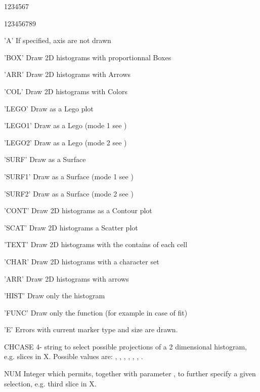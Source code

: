 \begin{DLtt}{1234567}
\begin{DLtt}{123456789}
\item['A']     If specified, axis are not drawn
\item['BOX']   Draw 2D histograms with proportionnal Boxes
\item['ARR']   Draw 2D histograms with Arrows
\item['COL']   Draw 2D histograms with Colors
\item['LEGO']  Draw as a Lego plot
\item['LEGO1'] Draw as a Lego (mode 1 see )
\item['LEGO2'] Draw as a Lego (mode 2 see )
\item['SURF']  Draw as a Surface
\item['SURF1'] Draw as a Surface (mode 1 see )
\item['SURF2'] Draw as a Surface (mode 2 see )
\item['CONT']  Draw 2D histograms as a Contour plot
\item['SCAT']  Draw 2D histograms a Scatter plot
\item['TEXT']  Draw 2D histograms with the contains of each cell
\item['CHAR']  Draw 2D histograms with a character set
\item['ARR']   Draw 2D histograms with arrows
\item['HIST']  Draw only the histogram
\item['FUNC']  Draw only the function (for example in case of fit)
\item['E']     Errors with current marker type and size are drawn.
\end{DLtt}
\item[CHCASE] 4-\CHARACTER{} string to select possible projections of a 2 
              dimensional histogram, e.g. slices in X. Possible values are: 
              , , , , , 
              , .
\item[NUM]    Integer which permits, together with parameter , to 
              further specify a given selection, e.g. third slice in X.
\end{DLtt}
\Remarks
